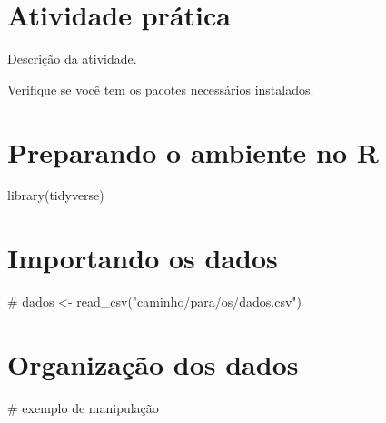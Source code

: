 \documentclass[
  letterpaper,
  DIV=11,
  numbers=noendperiod]{scrartcl}
\newenvironment{Shaded}{\begin{snugshade}}{\end{snugshade}}
\newcommand{\CommentTok}[1]{\textcolor[rgb]{0.37,0.37,0.37}{#1}}
\newcommand{\FunctionTok}[1]{\textcolor[rgb]{0.28,0.35,0.67}{#1}}
\newcommand{\NormalTok}[1]{\textcolor[rgb]{0.00,0.23,0.31}{#1}}
\begin{document}
\section{Atividade prática}\label{atividade-pruxe1tica}

Descrição da atividade.

\begin{tcolorbox}[enhanced jigsaw, arc=.35mm, bottomrule=.15mm, bottomtitle=1mm, breakable, colback=white, colbacktitle=quarto-callout-tip-color!10!white, colframe=quarto-callout-tip-color-frame, coltitle=black, left=2mm, leftrule=.75mm, opacityback=0, opacitybacktitle=0.6, rightrule=.15mm, title=\textcolor{quarto-callout-tip-color}{\faLightbulb}\hspace{0.5em}{Antes de começar}, titlerule=0mm, toprule=.15mm, toptitle=1mm]

Verifique se você tem os pacotes necessários instalados.

\end{tcolorbox}

\section{Preparando o ambiente no R}\label{preparando-o-ambiente-no-r}

\begin{Shaded}
\begin{Highlighting}[]
\FunctionTok{library}\NormalTok{(tidyverse)}
\end{Highlighting}
\end{Shaded}

\section{Importando os dados}\label{importando-os-dados}

\begin{Shaded}
\begin{Highlighting}[]
\CommentTok{\# dados \textless{}{-} read\_csv("caminho/para/os/dados.csv")}
\end{Highlighting}
\end{Shaded}

\section{Organização dos dados}\label{organizauxe7uxe3o-dos-dados}

\begin{Shaded}
\begin{Highlighting}[]
\CommentTok{\# exemplo de manipulação}
\end{Highlighting}
\end{Shaded}
\end{document}
